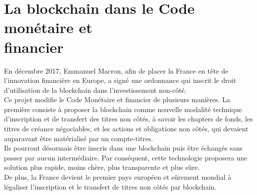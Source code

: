 \documentclass[12pt, a4paper, oneside]{book}
\begin{document}
    \section{La blockchain dans le Code monétaire et \\financier}

    En décembre 2017, Emmanuel Macron, afin de placer la France en tête de l'innovation financière en Europe, 
    a signé une ordonnance qui inscrit le droit d'utilisation de la blockchain dans l'investissement non-côté.
    \\
    \newline
    Ce projet modifie le Code Monétaire et financier de plusieurs manières. La première consiste à proposer la blockchain comme nouvelle 
    modalité technique d'inscription et de transfert des titres non côtés, à savoir les chapters de fonds, les titres de créance négociables,
    et les actions et obligations non côtés, qui devaient auparavant être matérialisé par un compte-titres.
    \\
    \newline
    Ils pourront désormais être inscris dans une blockchain puis être échangés sans passer par aucun intermédiaire.
    Par conséquent, cette technologie proposera une solution plus rapide, moins chère, plus transparente et plus sûre.
    \\
    \newline
    De plus, la France devient le premier pays européen et sûrement mondial à légaliser l'inscription et le transfert de titres non côtés par blockchain.
    \cite{CodeMonetaireFinancier}
 
 
 
    
    \backmatter
 

    
    
 
\end{document}
